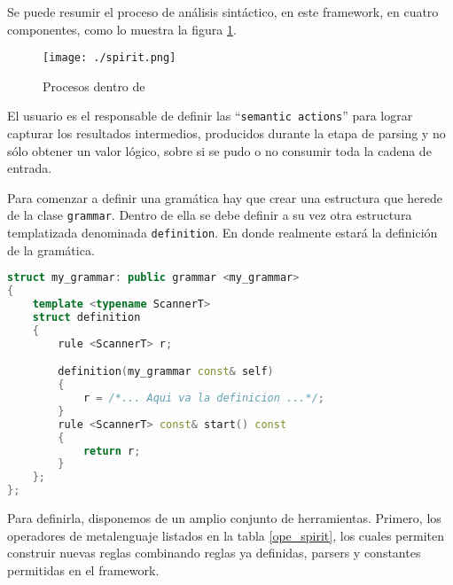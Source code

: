Se puede resumir el proceso de análisis sintáctico, en este framework, en cuatro componentes, como lo muestra la figura \ref{fig:procesoSpirit}.

\begin{figure}[!ht]\centering
\texttt{[image: ./spirit.png]}
\caption{Procesos dentro de \spirit}\label{fig:procesoSpirit}
\end{figure}

El usuario es el responsable de definir las ``\texttt{semantic actions}'' para lograr capturar los resultados intermedios, producidos durante la etapa de parsing y no sólo obtener un valor lógico, sobre si se pudo o no consumir toda la cadena de entrada.

Para comenzar a definir una gramática hay que crear una estructura que herede de la clase \texttt{grammar}. Dentro de ella se debe definir a su vez otra estructura templatizada denominada \texttt{definition}. En donde realmente estará la definición de la gramática.

\begin{lstlisting}[float, language=C++, basicstyle=\scriptsize, columns=fullflexible, linewidth=8cm]
struct my_grammar: public grammar <my_grammar>
{
    template <typename ScannerT>
    struct definition
    {
        rule <ScannerT> r;

        definition(my_grammar const& self)
        {
            r = /*... Aqui va la definicion ...*/;
        }
        rule <ScannerT> const& start() const
        {
            return r;
        }
    };
};
\end{lstlisting}

Para definirla, disponemos de un amplio conjunto de herramientas. Primero, los operadores de metalenguaje listados en la tabla \ref{ope_spirit}, los cuales permiten construir nuevas reglas combinando reglas ya definidas, parsers y constantes permitidas en el framework.

